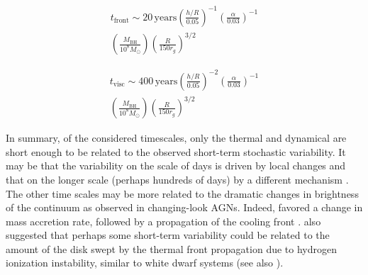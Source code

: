 \documentclass[twocolumn]{aastex62}
\begin{document}
  \begin{eqnarray}
  t_{\mathrm{front}} {\sim} 20 \,\mathrm{years} \left( \frac{h/R}{0.05}\right)^{-1}   \left( \frac{\alpha}{0.03}\right)^{-1}  \nonumber  \\ 
  \left( \frac{M_{\mathrm{BH}}}{10^{8} M_{\odot}}\right)     \left( \frac{R}{150 r_{g}}\right) ^{3/2} 
 \end{eqnarray}

  \begin{eqnarray}
  t_{\mathrm{visc}}  {\sim} 400 \, \mathrm{years} \left( \frac{h/R}{0.05}\right)^{-2}   \left( \frac{\alpha}{0.03}\right)^{-1} \nonumber  \\  
  \left(\frac{M_{\mathrm{BH}}}{10^{8} M_{\odot}} \right)     \left( \frac{R}{150 r_{g}}\right) ^{3/2}  
 \end{eqnarray}


In summary,  of the  considered timescales, only the thermal and dynamical are short enough to be related to  the observed short-term stochastic variability. It may be that the variability on the scale of days is driven by local changes and that on the longer scale (perhaps hundreds of days) by a different mechanism \citep{kokubo2015}. The other time scales may be more related to the dramatic changes in brightness of the continuum as observed in changing-look AGNs. Indeed, \citet{noda2018} favored a change in mass accretion rate, followed by a propagation of the cooling front \citep{simm2016,lawrence2018}. \citet{noda2018} also suggested that perhaps some short-term variability could be related to the amount of the disk swept by the thermal front propagation due to hydrogen ionization instability, similar to white dwarf systems (see also \citealt{ross2018, ruan2019, sniegowska2019}). 
\end{document}
